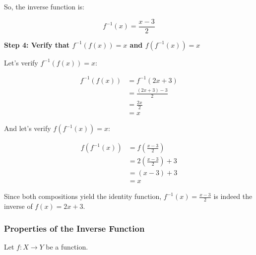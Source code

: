 So, the inverse function is:

\[
	f^{-1}(x) = \frac{x - 3}{2}
\]

\textbf{Step 4: Verify that \(f^{-1} (f (x)) = x\) and \(f(f^{-1} (x)) = x\)}

Let's verify \(f^{-1} (f (x)) = x\):

\begin{align*}
	f^{-1}(f(x)) & = f^{-1}(2x + 3)         \\
	             & = \frac{(2x + 3) - 3}{2} \\
	             & = \frac{2x}{2}           \\
	             & = x
\end{align*}

And let's verify \(f(f^{-1}(x)) = x\):

\begin{align*}
	f(f^{-1}(x)) & = f\left(\frac{x - 3}{2}\right)     \\
	             & = 2\left(\frac{x - 3}{2}\right) + 3 \\
	             & = (x - 3) + 3                       \\
	             & = x
\end{align*}

Since both compositions yield the identity function, \(f^{-1} (x) = \frac{x - 3}{2}\) is indeed the 
inverse of \(f (x) = 2x + 3\).

\subsubsection{Properties of the Inverse Function}

Let \(f:X\to Y\) be a function.

